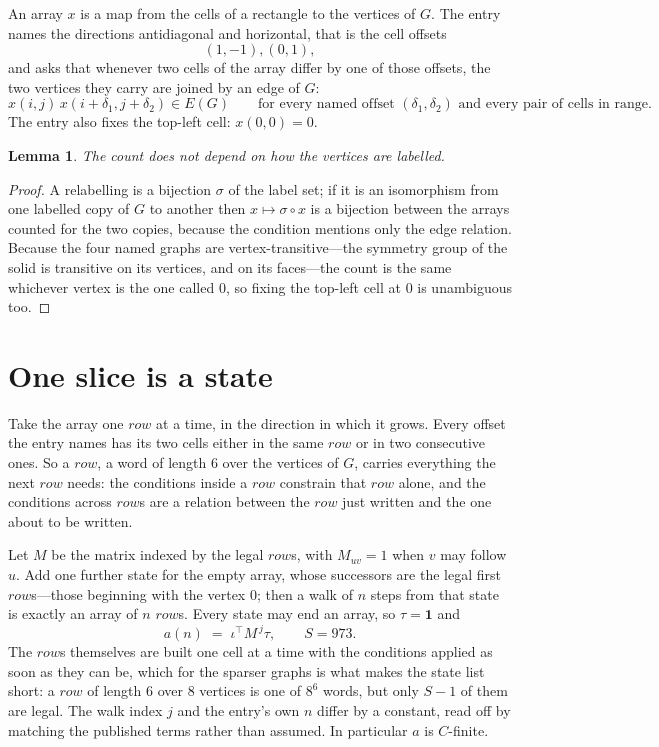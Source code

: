 \documentclass[11pt,a4paper]{article}
\theoremstyle{plain}
\newtheorem{lemma}[theorem]{Lemma}
\theoremstyle{definition}
\begin{document}
An array $x$ is a map from the cells of a rectangle to the vertices of $G$. The entry names the
directions antidiagonal and horizontal, that is the cell offsets
\[
(1,-1), (0,1),
\]
and asks that whenever two cells of the array differ by one of those offsets, the two vertices
they carry are joined by an edge of $G$:
\[
x(i,j)\,x(i+\delta_1,j+\delta_2)\in E(G)\qquad
\text{for every named offset } (\delta_1,\delta_2)\text{ and every pair of cells in range.}
\]
The entry also fixes the top-left cell: $x(0,0)=0$.

\begin{lemma}\label{lem:label}
The count does not depend on how the vertices are labelled.
\end{lemma}

\begin{proof}
A relabelling is a bijection $\sigma$ of the label set; if it is an isomorphism from one
labelled copy of $G$ to another then $x\mapsto\sigma\circ x$ is a bijection between the arrays
counted for the two copies, because the condition mentions only the edge relation.
Because the four named graphs are vertex-transitive---the symmetry group of the solid is transitive on its vertices, and on its faces---the count is the same whichever vertex is the one called $0$, so fixing the top-left cell at $0$ is unambiguous too.
\end{proof}

\section{One slice is a state}

Take the array one $row$ at a time, in the direction in which it grows.
Every offset the entry names has its two cells either in the same $row$ or in two
consecutive ones. So a $row$, a word of length $6$ over the vertices of $G$, carries
everything the next $row$ needs: the conditions inside a $row$ constrain that
$row$ alone, and the conditions across $row$s are a relation between the
$row$ just written and the one about to be written.

Let $M$ be the matrix indexed by the legal $row$s, with $M_{uv}=1$ when $v$ may
follow $u$. Add one further state for the empty array, whose successors are the legal first
$row$s---those beginning with the vertex $0$; then a walk of
$n$ steps from that state is exactly an array of $n$ $row$s. Every state may end an
array, so $\tau=\mathbf{1}$ and
\[
a(n)\;=\;\iota^{\!\top}M^{\,j}\tau ,\qquad S=973.
\]
The $row$s themselves are built one cell at a time with the conditions applied as soon
as they can be, which for the sparser graphs is what makes the state list short: a $row$
of length $6$ over $8$ vertices is one of $8^{6}$ words, but only $S-1$ of them are
legal. The walk index $j$ and the entry's own $n$ differ by a constant, read off by matching the
published terms rather than assumed. In particular $a$ is $C$-finite.
\end{document}
